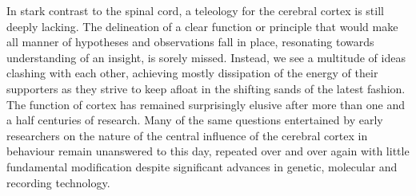 In stark contrast to the spinal cord, a teleology for the cerebral cortex is still deeply lacking. The delineation of a clear function or principle that would make all manner of hypotheses and observations fall in place, resonating towards understanding of an insight, is sorely missed. Instead, we see a multitude of ideas clashing with each other, achieving mostly dissipation of the energy of their supporters as they strive to keep afloat in the shifting sands of the latest fashion. The function of cortex has remained surprisingly elusive after more than one and a half centuries of research. Many of the same questions entertained by early researchers on the nature of the central influence of the cerebral cortex in behaviour remain unanswered to this day, repeated over and over again with little fundamental modification despite significant advances in genetic, molecular and recording technology.
